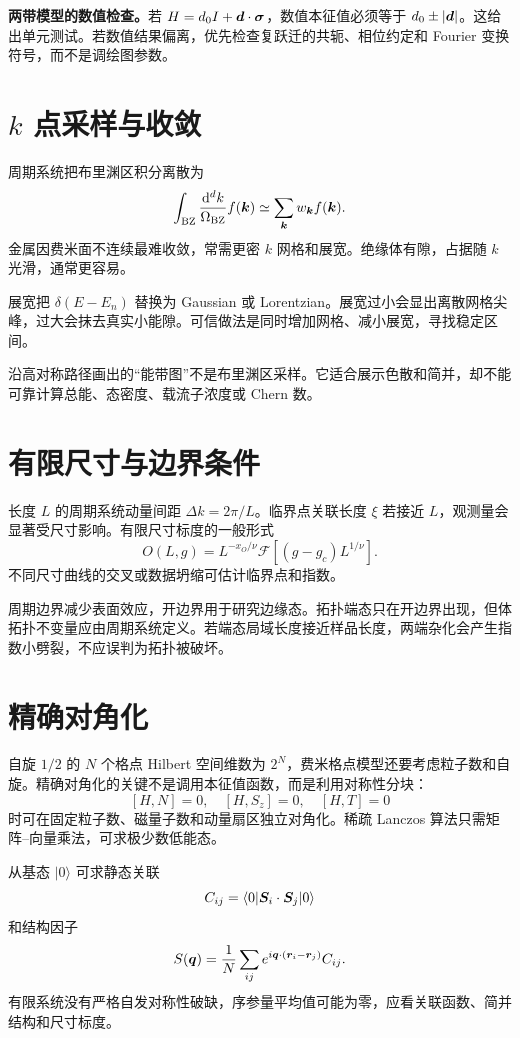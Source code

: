 \begin{examplebox}
\textbf{两带模型的数值检查。}若
$H=d_0I+\bm{d}\cdot\bm{\sigma}$，数值本征值必须等于
$d_0\pm|\bm{d}|$。这给出单元测试。若数值结果偏离，优先检查复跃迁的共轭、相位约定和 Fourier 变换符号，而不是调绘图参数。
\end{examplebox}

\section{$k$ 点采样与收敛}
周期系统把布里渊区积分离散为
\[
\int_{\rm BZ}\frac{\mathrm d^dk}{\Omega_{\rm BZ}}f(\bm{k})
\simeq\sum_{\bm{k}}w_{\bm{k}}f(\bm{k}).
\]
金属因费米面不连续最难收敛，常需更密 $k$ 网格和展宽。绝缘体有隙，占据随 $k$ 光滑，通常更容易。

展宽把 $\delta(E-E_n)$ 替换为 Gaussian 或 Lorentzian。展宽过小会显出离散网格尖峰，过大会抹去真实小能隙。可信做法是同时增加网格、减小展宽，寻找稳定区间。

\begin{pitfallbox}
沿高对称路径画出的“能带图”不是布里渊区采样。它适合展示色散和简并，却不能可靠计算总能、态密度、载流子浓度或 Chern 数。
\end{pitfallbox}

\section{有限尺寸与边界条件}
长度 $L$ 的周期系统动量间距
$\Delta k=2\pi/L$。临界点关联长度 $\xi$ 若接近 $L$，观测量会显著受尺寸影响。有限尺寸标度的一般形式
\[
O(L,g)=L^{-x_O/\nu}
\mathcal F[(g-g_c)L^{1/\nu}].
\]
不同尺寸曲线的交叉或数据坍缩可估计临界点和指数。

周期边界减少表面效应，开边界用于研究边缘态。拓扑端态只在开边界出现，但体拓扑不变量应由周期系统定义。若端态局域长度接近样品长度，两端杂化会产生指数小劈裂，不应误判为拓扑被破坏。

\section{精确对角化}
自旋 $1/2$ 的 $N$ 个格点 Hilbert 空间维数为 $2^N$，费米格点模型还要考虑粒子数和自旋。精确对角化的关键不是调用本征值函数，而是利用对称性分块：
\[
[H,N]=0,\quad[H,S_z]=0,\quad[H,T]=0
\]
时可在固定粒子数、磁量子数和动量扇区独立对角化。稀疏 Lanczos 算法只需矩阵--向量乘法，可求极少数低能态。

从基态 $|0\rangle$ 可求静态关联
\[
C_{ij}=\langle0|\bm{S}_i\cdot\bm{S}_j|0\rangle
\]
和结构因子
\[
S(\bm{q})=\frac1N\sum_{ij}e^{i\bm{q}\cdot(\bm{r}_i-\bm{r}_j)}C_{ij}.
\]
有限系统没有严格自发对称性破缺，序参量平均值可能为零，应看关联函数、简并结构和尺寸标度。

